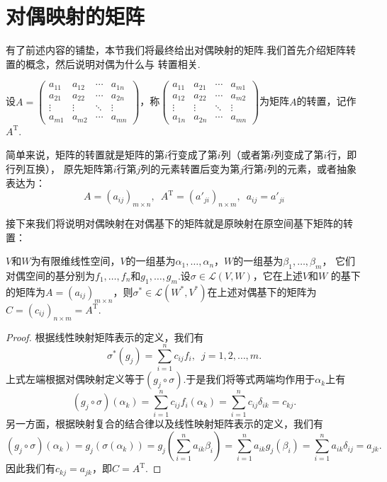 \section{对偶映射的矩阵}
有了前述内容的铺垫，本节我们将最终给出对偶映射的矩阵.我们首先介绍矩阵转置的概念，然后说明对偶为什么与
转置相关.
\begin{definition}
    设$A=\begin{pmatrix}
        a_{11} & a_{12} & \cdots & a_{1n} \\
        a_{21} & a_{22} & \cdots & a_{2n} \\
        \vdots & \vdots & \ddots & \vdots \\
        a_{m1} & a_{m2} & \cdots & a_{mn}
    \end{pmatrix}$，称$\begin{pmatrix}
        a_{11} & a_{21} & \cdots & a_{m1} \\
        a_{12} & a_{22} & \cdots & a_{m2} \\
        \vdots & \vdots & \ddots & \vdots \\
        a_{1n} & a_{2n} & \cdots & a_{mn}
    \end{pmatrix}$为矩阵$A$的转置，记作$A^\mathrm{T}$.
\end{definition}

简单来说，矩阵的转置就是矩阵的第$i$行变成了第$i$列（或者第$i$列变成了第$i$行，即行列互换），
原先矩阵第$i$行第$j$列的元素转置后变为第$j$行第$i$列的元素，或者抽象表达为：
\[A=(a_{ij})_{m \times n},\enspace A^\mathrm{T}=(a'_{ji})_{n \times m},\enspace a_{ij}=a'_{ji}\]

接下来我们将说明对偶映射在对偶基下的矩阵就是原映射在原空间基下矩阵的转置：
\begin{theorem}
    $V$和$W$为有限维线性空间，$V$的一组基为$\alpha_1,\ldots,\alpha_n$，$W$的一组基为$\beta_1,\ldots,\beta_m$，
    它们对偶空间的基分别为$f_1,\ldots,f_n$和$g_1,\ldots,g_m$.设$\sigma\in\mathcal{L}(V,W)$，它在上述$V$和$W$
    的基下的矩阵为$A=(a_{ij})_{m \times n}$，则$\sigma^*\in\mathcal{L}(W^*,V^*)$在上述对偶基下的矩阵为
    $C=(c_{ij})_{n \times m}=A^\mathrm{T}$.
\end{theorem}
\begin{proof}
    根据线性映射矩阵表示的定义，我们有
    \[\sigma^*(g_j)=\sum\limits_{i=1}^nc_{ij}f_i,\enspace j=1,2,\ldots,m.\]
    上式左端根据对偶映射定义等于$(g_j\circ\sigma)$.于是我们将等式两端均作用于$\alpha_k$上有
    \[(g_j\circ\sigma)(\alpha_k)=\sum\limits_{i=1}^nc_{ij}f_i(\alpha_k)=\sum\limits_{i=1}^nc_{ij}\delta_{ik}=c_{kj}.\]
    另一方面，根据映射复合的结合律以及线性映射矩阵表示的定义，我们有
    \[(g_j\circ\sigma)(\alpha_k)=g_j(\sigma(\alpha_k))=g_j\left(\sum\limits_{i=1}^na_{ik}\beta_i\right)=\sum\limits_{i=1}^na_{ik}g_j(\beta_i)=\sum\limits_{i=1}^na_{ik}\delta_{ij}=a_{jk}.\]
    因此我们有$c_{kj}=a_{jk}$，即$C=A^\mathrm{T}$.
\end{proof}

